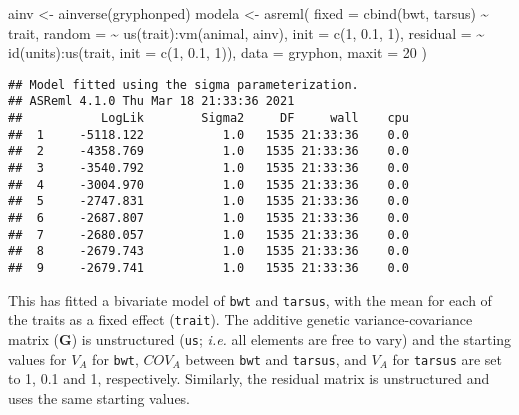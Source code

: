 \documentclass[
  12pt,
]{book}
\newenvironment{Shaded}{\begin{snugshade}}{\end{snugshade}}
\newcommand{\AttributeTok}[1]{\textcolor[rgb]{0.77,0.63,0.00}{#1}}
\newcommand{\DecValTok}[1]{\textcolor[rgb]{0.00,0.00,0.81}{#1}}
\newcommand{\FloatTok}[1]{\textcolor[rgb]{0.00,0.00,0.81}{#1}}
\newcommand{\FunctionTok}[1]{\textcolor[rgb]{0.00,0.00,0.00}{#1}}
\newcommand{\NormalTok}[1]{#1}
\newcommand{\OtherTok}[1]{\textcolor[rgb]{0.56,0.35,0.01}{#1}}
\newcommand{\SpecialCharTok}[1]{\textcolor[rgb]{0.00,0.00,0.00}{#1}}
\begin{document}
\begin{Shaded}
\begin{Highlighting}[]
\NormalTok{ainv }\OtherTok{\textless{}{-}} \FunctionTok{ainverse}\NormalTok{(gryphonped)}
\NormalTok{modela }\OtherTok{\textless{}{-}} \FunctionTok{asreml}\NormalTok{(}
  \AttributeTok{fixed =} \FunctionTok{cbind}\NormalTok{(bwt, tarsus) }\SpecialCharTok{\textasciitilde{}}\NormalTok{ trait,}
  \AttributeTok{random =} \SpecialCharTok{\textasciitilde{}} \FunctionTok{us}\NormalTok{(trait)}\SpecialCharTok{:}\FunctionTok{vm}\NormalTok{(animal, ainv), }\AttributeTok{init =} \FunctionTok{c}\NormalTok{(}\DecValTok{1}\NormalTok{, }\FloatTok{0.1}\NormalTok{, }\DecValTok{1}\NormalTok{),}
  \AttributeTok{residual =} \SpecialCharTok{\textasciitilde{}} \FunctionTok{id}\NormalTok{(units)}\SpecialCharTok{:}\FunctionTok{us}\NormalTok{(trait, }\AttributeTok{init =} \FunctionTok{c}\NormalTok{(}\DecValTok{1}\NormalTok{, }\FloatTok{0.1}\NormalTok{, }\DecValTok{1}\NormalTok{)),}
  \AttributeTok{data =}\NormalTok{ gryphon,}
  \AttributeTok{maxit =} \DecValTok{20}
\NormalTok{)}
\end{Highlighting}
\end{Shaded}

\begin{verbatim}
## Model fitted using the sigma parameterization.
## ASReml 4.1.0 Thu Mar 18 21:33:36 2021
##           LogLik        Sigma2     DF     wall    cpu
##  1     -5118.122           1.0   1535 21:33:36    0.0
##  2     -4358.769           1.0   1535 21:33:36    0.0
##  3     -3540.792           1.0   1535 21:33:36    0.0
##  4     -3004.970           1.0   1535 21:33:36    0.0
##  5     -2747.831           1.0   1535 21:33:36    0.0
##  6     -2687.807           1.0   1535 21:33:36    0.0
##  7     -2680.057           1.0   1535 21:33:36    0.0
##  8     -2679.743           1.0   1535 21:33:36    0.0
##  9     -2679.741           1.0   1535 21:33:36    0.0
\end{verbatim}

This has fitted a bivariate model of \texttt{bwt} and \texttt{tarsus}, with the mean for each of the traits as a fixed effect (\texttt{trait}). The additive genetic variance-covariance matrix (\(\textbf{G}\)) is unstructured (\texttt{us}; \emph{i.e.} all elements are free to vary) and the starting values for \(V_A\) for \texttt{bwt}, \(COV_A\) between \texttt{bwt} and \texttt{tarsus}, and \(V_A\) for \texttt{tarsus} are set to 1, 0.1 and 1, respectively. Similarly, the residual matrix is unstructured and uses the same starting values.
\end{document}
